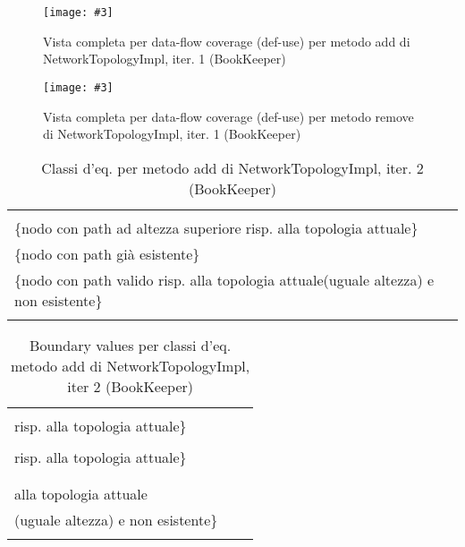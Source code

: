\documentclass[10pt, a4paper]{article}
\newcommand{\Intmaketable}[4]{
	\begin{longtable}{#3}
	#4
	\caption{#2}
	\label{#1}
	\end{longtable}
}
\newcommand{\Intceqtable}[3]{
	\Intmaketable{#1}{#2}{|l|l|}{
	\hline
	\thead{Parametro formale} & \thead{Classi d'equivalenza} \\
	\hline
	\hline
	#3
	\hline}
}
\newcommand{\Intbvtable}[3]{
	\Intmaketable{#1}{#2}{|l|l|l|}{
	\hline
	\thead{Parametro formale} & \thead{Classe d'equivalenza} & \thead{Boundary value}\\
	\hline
	\hline
	#3
	\hline}
}
\newcommand{\Intceqcaption}[4]{Classi d'eq. per metodo #1 di #2, iter. #3 (#4)}
\newcommand{\Intbvcaption}[4]{Boundary values per classi d'eq. metodo #1 di #2, iter #3 (#4)}
\newcommand{\gettablelabel}[5]{table:#1:#2:#3:iter#4:proj#5}
\newcommand{\ceqtable}[5]{
	\Intceqtable{\gettablelabel{ceq}{#1}{#2}{#3}{#4}}
		{\Intceqcaption{#1}{#2}{#3}{#4}}
		{#5}
}
\newcommand{\bvtable}[5]{
	\Intbvtable{\gettablelabel{bv}{#1}{#2}{#3}{#4}}
		{\Intbvcaption{#1}{#2}{#3}{#4}}
		{#5}
}
\newcommand{\getpicturelabel}[1]{picture:#1}
\newcommand{\makepicture}[4]{
	\begin{figure}[H]
	\centering
	\texttt{[image: \#3]}
	\caption{#4}
	\label{\getpicturelabel{#3}}
	\end{figure}
}
\newcommand{\alldfcovcaption}[4]{Vista completa per data-flow coverage (def-use) per metodo #1 di #2, iter. #3 (#4)}
\newcommand{\tcell}{\makecell[tl]}
\newcommand{\newtrow}{\\ \hline}
\def\bookkeeper{BookKeeper}
\newcommand{\ceq}[1]{\{#1\}}
\begin{document}
	\makepicture{10cm}{19cm}{bk/dataflow-add-NetworkTopologyImpl-1}
				{\alldfcovcaption{add}{NetworkTopologyImpl}{1}{\bookkeeper}}
				
	\makepicture{10cm}{12cm}{bk/dataflow-remove-NetworkTopologyImpl-1}
				{\alldfcovcaption{remove}{NetworkTopologyImpl}{1}{\bookkeeper}}

	
	\ceqtable{add}{NetworkTopologyImpl}{2}{\bookkeeper}{
			\tcell{node} & \tcell{
									\ceq{nodo con path ad altezza inferiore risp. alla topologia attuale} \\
									\ceq{nodo con path ad altezza superiore risp. alla topologia attuale} \\
									\ceq{nodo con path già esistente} \\
									\ceq{nodo con path valido risp. alla topologia attuale(uguale altezza) e non esistente}
								}
		\newtrow
	}
	
	\bvtable{add}{NetworkTopologyImpl}{2}{\bookkeeper}{
			\tcell{node} & 
			\tcell{\ceq{nodo con path ad altezza inferiore\\ risp. alla topologia attuale}} &
			\tcell{Node("/rack-1/bookie-1")}
		\newtrow
			\tcell{node} &
			\tcell{\ceq{nodo con path ad altezza superiore\\ risp. alla topologia attuale}} &
			\tcell{Node("/region-1/dc-1/rack-1/bookie-1")}
		\newtrow
			\tcell{node} &
			\tcell{\ceq{nodo con path già esistente}} &
			\tcell{Node("/dc-1/rack-1/bookie-1")}
		\newtrow
			\tcell{node} &
			\tcell{\ceq{nodo con path valido risp.\\ alla topologia attuale\\(uguale altezza) e non esistente}} &
			\tcell{Node("/dc-3/rack-4/bookie-7")}
		\newtrow
	}
	
\end{document}
